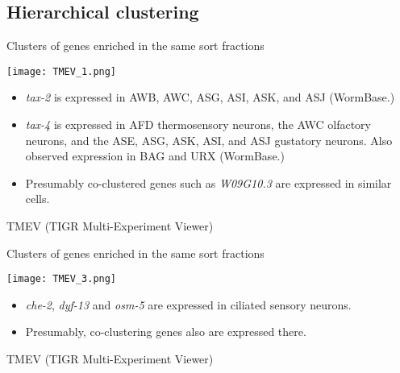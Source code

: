 \documentclass[serif,9pt]{beamer}
\begin{document}
\subsection{Hierarchical clustering}

\begin{frame}{Clusters of genes enriched in the same sort fractions}
\begin{minipage}{0.5\textwidth}
\texttt{[image: TMEV\_1.png]}
\end{minipage}
\begin{minipage}{0.48\textwidth}
{\small 
\begin{itemize}

\item {\em tax-2} is expressed in AWB, AWC, ASG, ASI, ASK, and ASJ (WormBase.)

\item {\em tax-4} is expressed in AFD thermosensory neurons, the AWC olfactory neurons, and the ASE, ASG, ASK, ASI, and ASJ gustatory neurons. Also observed expression in BAG and URX (WormBase.)

\item Presumably co-clustered genes such as {\em W09G10.3} are expressed
in similar cells.

\end{itemize}
}
\end{minipage}
\vspace{5mm}

\hfill TMEV (TIGR Multi-Experiment Viewer)
\end{frame}

\begin{frame}{Clusters of genes enriched in the same sort fractions}

\begin{minipage}{0.45\textwidth}
\texttt{[image: TMEV\_3.png]}
\end{minipage}
\begin{minipage}{0.48\textwidth}
\begin{itemize}

\item {\em che-2}, {\em dyf-13} and {\em osm-5} are expressed in ciliated
sensory neurons.

\item Presumably, co-clustering genes also are expressed there.
\end{itemize}

\end{minipage}

\hfill TMEV (TIGR Multi-Experiment Viewer)
\end{frame}
\end{document}
